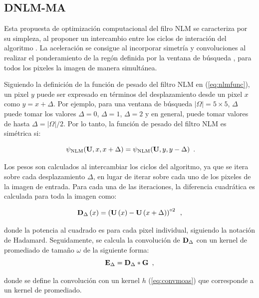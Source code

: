 {\subsection{DNLM-MA}
\label{ch:marco_condat}

Esta propuesta de optimizaci\'on computacional del filro NLM se caracteriza por su simpleza, al proponer un intercambio entre los ciclos de interaci\'on del algoritmo \cite{Condat2010}. La aceleraci\'on se consigue al incorporar simetr\'ia y convoluciones al realizar el ponderamiento de la reg\'on definida por la ventana de b\'usqueda \mat{\Omega}, para todos los pixeles la imagen de manera simult\'anea.

Siguiendo la definici\'on de la funci\'on de pesado del filtro NLM en (\ref{eq:nlmfunc}), un pixel $y$ puede ser expresado en t\'erminos del desplazamiento desde un pixel $x$ como $y = x + \Delta$. Por ejemplo, para una ventana de b\'usqueda $\vert\Omega\vert = 5 \times 5$, $\Delta$ puede tomar los valores $\Delta=0$, $\Delta=1$, $\Delta=2$ y en general, puede tomar valores de hasta $\Delta=\vert\Omega\vert/2$. Por lo tanto, la funci\'on de pesado del filtro NLM es sim\'etrica si:

\begin{equation}\
\psi_{\text{NLM}}(\mathbf{U}, x, x + \Delta) = \psi_{\text{NLM}}(\mathbf{U}, y, y - \Delta)  \enspace . 
\label{eq:symmetry}
\end{equation}

Los pesos son calculados al intercambiar los ciclos del algoritmo, ya que se itera sobre cada desplazamiento $\Delta$, en lugar de iterar sobre cada uno de los pixeles de la imagen de entrada. Para cada una de las iteraciones, la diferencia cuadr\'atica es calculada para toda la imagen como:

\begin{equation}
\mathbf{D}_\Delta\left(x\right) = \left(\mathbf{U}\left(x\right) - \mathbf{U}\left( x + \Delta \right)\right)^{\circ2}  \enspace ,
\label{eq:diffquad}
\end{equation}

donde la potencia al cuadrado es para cada pixel individual, siguiendo la notaci\'on de Hadamard. Seguidamente, se calcula la convoluci\'on de
$\mathbf{D}_\Delta$ con un kernel de promediado de tama\~no $\omega$ de la siguiente forma:
\begin{equation}
\label{eq:convmoas}
\mathbf{E}_{\Delta} = \mathbf{D}_{\Delta} * \mathbf{G} \enspace ,
\end{equation}

donde se define la convoluci\'on con un kernel $h$ (\ref{eq:convmoas}) que corresponde a un kernel de promediado.


}
